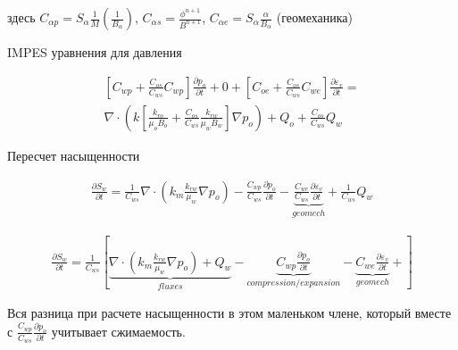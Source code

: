 \documentclass[14pt]{article}
\begin{document}
	здесь $C_{\alpha p} = S_{\alpha} \frac{1}{M} (\frac{1}{B_{\alpha}})$, $C_{\alpha s} = \frac{\phi^{n+1}}{B^{n+1}}$, $C_{\alpha e} = S_{\alpha} \frac{\alpha}{B_{\alpha}} $ (геомеханика)
	
	IMPES уравнения для давления
	
	\begin{eqnarray}
		\left[ C_{wp} + \frac{C_{os}}{C_{ws}} C_{wp} \right] \frac{\partial p_{o}}{\partial t} + 
		0 + 
		\left[C_{oe} + \frac{C_{os}}{C_{ws}} C_{we} \right] \frac{\partial \varepsilon_{v}}{\partial t} = \\
		\nabla \cdot \left( k \left[ \frac{k_{ro}}{\mu_{o} B_{o}} + \frac{C_{os}}{C_{ws}} \frac{k_{rw}}{\mu_{w} B_{w}} \right] \nabla p_{o} \right) + 
		Q_{o} + \frac{C_{os}}{C_{ws}} Q_{w}
	\end{eqnarray}
	
	Пересчет насыщенности
	
	\begin{eqnarray}
		 \frac{\partial S_{w}}{\partial t} =
		\frac{1}{C_{ws}} \nabla \cdot \left( k_{m} \frac{k_{rw}}{\mu_{w}} \nabla p_{o} \right) - 
		\frac{C_{wp}}{C_{ws}} \frac{\partial p_{o}}{\partial t} -
		\underbrace{ \frac{C_{we}}{C_{ws}} \frac{\partial \varepsilon_{v}}{\partial t} }_{geomech} +
		\frac{1}{C_{ws}} Q_{w}
	\end{eqnarray}
	
	\begin{eqnarray}
		\frac{\partial S_{w}}{\partial t} =
		\frac{1}{C_{ws}}  \left[ 
		\underbrace{ \nabla \cdot \left( k_{m} \frac{k_{rw}}{\mu_{w}} \nabla p_{o} \right) + 
	 	Q_{w} }_{fluxes} - 
		\underbrace{ C_{wp} \frac{\partial p_{o}}{\partial t} }_{compression/expansion} -
		\underbrace{ C_{we} \frac{\partial \varepsilon_{v}}{\partial t} }_{geomech} +
		 \right]
	\end{eqnarray}
	
	Вся разница при расчете насыщенности в этом маленьком члене, который вместе с $\frac{C_{wp}}{C_{ws}} \frac{\partial p_{o}}{\partial t}$ учитывает сжимаемость. 

\newpage


\newpage
\end{document}
